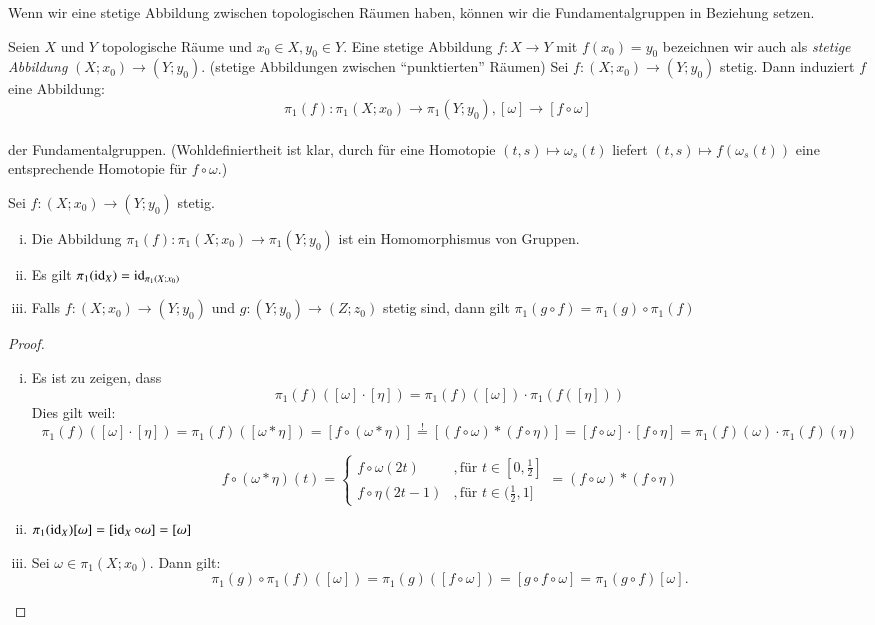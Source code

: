 \documentclass[a4paper,10pt]{scrartcl}
\begin{document}
Wenn wir eine stetige Abbildung zwischen topologischen Räumen haben, können wir die Fundamentalgruppen in Beziehung setzen.
\begin{df}
 Seien $X$ und $Y$ topologische Räume und $x_0\in X, y_0 \in Y$. Eine stetige Abbildung $f: X\to Y$ mit $f(x_0)=y_0$ bezeichnen wir auch als \emph{stetige Abbildung} $(X;x_0)\to (Y;y_0)$. (stetige Abbildungen zwischen "`punktierten"' Räumen) Sei $f: (X;x_0) \to (Y;y_0)$ stetig.  Dann induziert $f$ eine Abbildung:
\[
 \pi_1 (f) : \pi_1(X;x_0)\to \pi_1(Y;y_0), [\omega] \to [f \circ \omega]
\]
\fixme[fig64]\\
der Fundamentalgruppen. (Wohldefiniertheit ist klar, durch für eine Homotopie $(t,s)\mapsto \omega_s(t)$ liefert $(t,s) \mapsto f(\omega_s(t))$ eine entsprechende Homotopie für $f\circ \omega$.)
\end{df}
\begin{st}
 Sei $f: (X;x_0)\to (Y;y_0)$ stetig.
\begin{enumerate}[(i)]
 \item Die Abbildung $\pi_1(f): \pi_1(X;x_0) \to \pi_1(Y;y_0)$ ist ein Homomorphismus von Gruppen.
 \item Es gilt $\pi_1(\operatorname{id}_X)=\operatorname{id}_{\pi_1(X; x_0)}$
 \item Falls $f:(X;x_0) \to (Y;y_0)$ und $g: (Y; y_0) \to (Z; z_0)$ stetig sind, dann gilt $\pi_1(g\circ f)=\pi_1(g)\circ \pi_1(f)$
\end{enumerate}
\end{st}
\begin{proof}
\begin{enumerate}[(i)]
\item Es ist zu zeigen, dass
\[
 \pi_1(f)([\omega]\cdot [\eta])=\pi_1(f)([\omega])\cdot \pi_1(f([\eta]))
\]
Dies gilt weil: 
$$
\pi_1(f)([\omega]\cdot [\eta])=\pi_1(f)([\omega*\eta])= [f\circ (\omega*\eta)] \stackrel ! = [(f\circ \omega)*(f\circ \eta)]=[f\circ \omega] \cdot [f\circ \eta]=\pi_1(f)(\omega)\cdot \pi_1(f)(\eta)
$$

\[
 f\circ(\omega*\eta)(t)=\begin{cases} f\circ \omega (2t) &, \text{für } t\in[0,\frac{1}{2}]\\  f\circ \eta (2t - 1) &, \text{für } t\in(\frac{1}{2},1]\end{cases} = (f \circ \omega) * (f \circ \eta)
\]
\item $\pi_1(\operatorname{id}_X)[\omega]=[\operatorname{id}_X\circ \omega]=[\omega]$
\item Sei $\omega\in \pi_1(X;x_0)$. Dann gilt:
\[
 \pi_1(g)\circ \pi_1(f)([\omega])=\pi_1(g)([f\circ \omega])=[g\circ f \circ \omega]=\pi_1(g\circ f) [\omega].
\]
\end{enumerate}
\end{proof}
\end{document}
